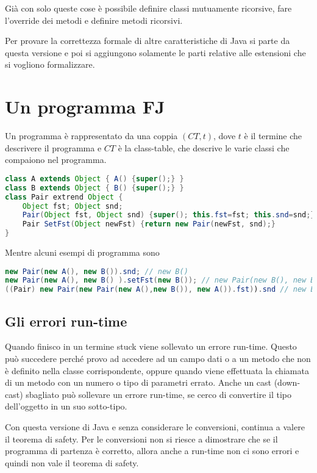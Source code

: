 \noindent Già con solo queste cose è possibile definire classi mutuamente ricorsive, fare l'override dei metodi e definire metodi ricorsivi.

Per provare la correttezza formale di altre caratteristiche di Java si parte da questa versione e poi si aggiungono solamente le parti relative alle estensioni che si vogliono formalizzare.

\section{Un programma FJ}

Un programma è rappresentato da una coppia $(CT, t)$, dove $t$ è il termine che descrivere il programma e $CT$ è la class-table, che descrive le varie classi che compaiono nel programma.

\begin{lstlisting}[language=Java]
class A extends Object { A() {super();} }
class B extends Object { B() {super();} }
class Pair extrend Object {
	Object fst; Object snd;
	Pair(Object fst, Object snd) {super(); this.fst=fst; this.snd=snd;}
	Pair SetFst(Object newFst) {return new Pair(newFst, snd);}
}
\end{lstlisting}

\noindent Mentre alcuni esempi di programma sono

\begin{lstlisting}[language=Java]
new Pair(new A(), new B()).snd; // new B()
new Pair(new A(), new B() ).setFst(new B()); // new Pair(new B(), new B())
((Pair) new Pair(new Pair(new A(),new B()), new A()).fst)).snd // new B()
\end{lstlisting}

\subsection{Gli errori run-time}

Quando finisco in un termine stuck viene sollevato un errore run-time. Questo può succedere perché provo ad accedere ad un campo dati o a un metodo che non è definito nella classe corrispondente, oppure quando viene effettuata la chiamata di un metodo con un numero o tipo di parametri errato.
Anche un cast (down-cast) sbagliato può sollevare un errore run-time, se cerco di convertire il tipo dell'oggetto in un suo sotto-tipo.

Con questa versione di Java e senza considerare le conversioni, continua a valere il teorema di safety. Per le conversioni non si riesce a dimostrare che se il programma di partenza è corretto, allora anche a run-time non ci sono errori e quindi non vale il teorema di safety.














